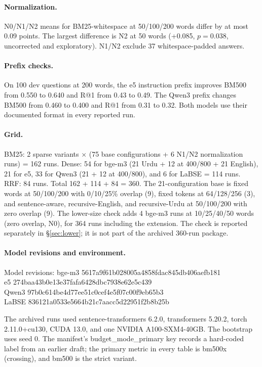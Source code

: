 \documentclass[11pt]{article}
\begin{document}
\paragraph{Normalization.}
N0/N1/N2 means for BM25-whitespace at 50/100/200 words differ by at most 0.09 points. The largest
difference is N2 at 50 words (+0.085, $p=0.038$, uncorrected and exploratory). N1/N2 exclude 37
whitespace-padded answers.

\paragraph{Prefix checks.}
On 100 dev questions at 200 words, the e5 instruction prefix improves BM500 from 0.550 to 0.640 and
R@1 from 0.43 to 0.49. The Qwen3 prefix changes BM500 from 0.460 to 0.400 and R@1 from 0.31 to 0.32.
Both models use their documented format in every reported run.

\paragraph{Grid.}
BM25: 2 sparse variants $\times$ (75 base configurations + 6 N1/N2 normalization runs) = 162 runs.
Dense: 54 for bge-m3 (21 Urdu + 12 at 400/800 + 21 English), 21 for e5, 33 for Qwen3
(21 + 12 at 400/800), and 6 for LaBSE = 114 runs. RRF: 84 runs. Total 162 + 114 + 84 = 360.
The 21-configuration base is fixed words at 50/100/200 with 0/10/25\% overlap (9), fixed tokens at
64/128/256 (3), and sentence-aware, recursive-English, and recursive-Urdu at 50/100/200 with zero
overlap (9). The lower-size check adds 4 bge-m3 runs at 10/25/40/50 words (zero overlap, N0), for
364 runs including the extension. The check is reported separately in \S\ref{sec:lower}; it is not
part of the archived 360-run package.

\paragraph{Model revisions and environment.}
\begin{flushleft}\footnotesize
Model revisions: bge-m3 \textsf{5617a9f61b028005a4858fdac845db406aefb181}\\
e5 \textsf{274baa43b0e13e37fafa6428dbc7938e62e5c439}\\
Qwen3 \textsf{97b0c614be4d77ee51c0cef4e5f07c00f9eb65b3}\\
LaBSE \textsf{836121a0533e5664b21c7aacc5d22951f2b8b25b}
\end{flushleft}
The archived runs used sentence-transformers
6.2.0, transformers 5.20.2, torch 2.11.0+cu130, CUDA 13.0, and one NVIDIA A100-SXM4-40GB. The
bootstrap uses seed 0. The manifest's \textsf{budget\_mode\_primary} key records a hard-coded label
from an earlier draft; the primary metric in every table is \textsf{bm500x} (crossing), and
\textsf{bm500} is the strict variant.
\end{document}
